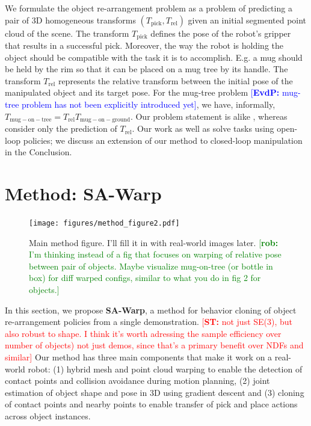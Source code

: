 \documentclass{article}
\newcommand{\evdp}[1]{\textcolor{blue}{[\textbf{EvdP:} #1]}}
\newcommand{\rob}[1]{\textcolor{green}{[\textbf{rob:} #1]}}
\newcommand{\rst}
[1]{\textcolor{red}
{[\textbf{ST:} #1]}}
\begin{document}
We formulate the object re-arrangement problem as a problem of predicting a pair of 3D homogeneous transforms $(T_\mathrm{pick}, T_\mathrm{rel})$ given an initial segmented point cloud of the scene. The transform $T_\mathrm{pick}$ defines the pose of the robot's gripper that results in a successful pick. Moreover, the way the robot is holding the object should be compatible with the task it is to accomplish. E.g. a mug should be held by the rim so that it can be placed on a mug tree by its handle. The transform $T_\mathrm{rel}$ represents the relative transform between the initial pose of the manipulated object and its target pose. For the mug-tree problem \evdp{mug-tree problem has not been explicitly introduced yet}, we have, informally, $T_{\mathrm{mug-on-tree}} = T_\mathrm{rel} T_{\mathrm{mug-on-ground}}$. Our problem statement is alike \cite{simeonov22neural,simeonov22se}, whereas \cite{pan22taxpose} consider only the prediction of $T_\mathrm{rel}$. Our work as well as \cite{simeonov22neural,simeonov22se,pan22taxpose} solve tasks using open-loop policies; we discuss an extension of our method to closed-loop manipulation in the Conclusion.

\section{Method: SA-Warp}

\begin{figure}
    \centering
    \texttt{[image: figures/method\_figure2.pdf]}
    \caption{Main method figure. I'll fill it in with real-world images later. \rob{I'm thinking instead of a fig that focuses on warping of relative pose between pair of objects. Maybe visualize mug-on-tree (or bottle in box) for diff warped configs, similar to what you do in fig 2 for objects.}}
    \label{fig:method}
\end{figure}

In this section, we propose \textbf{SA-Warp}, a method for behavior cloning of object re-arrangement policies from a single demonstration. \rst{not just SE(3), but also robust to shape. I think it's worth adressing the sample efficiency over number of objects) not just demos, since that's a primary benefit over NDFs and similar} Our method has three main components that make it work on a real-world robot: (1) hybrid mesh and point cloud warping to enable the detection of contact points and collision avoidance during motion planning, (2) joint estimation of object shape and pose in 3D using gradient descent and (3) cloning of contact points and nearby points to enable transfer of pick and place actions across object instances.
\end{document}
